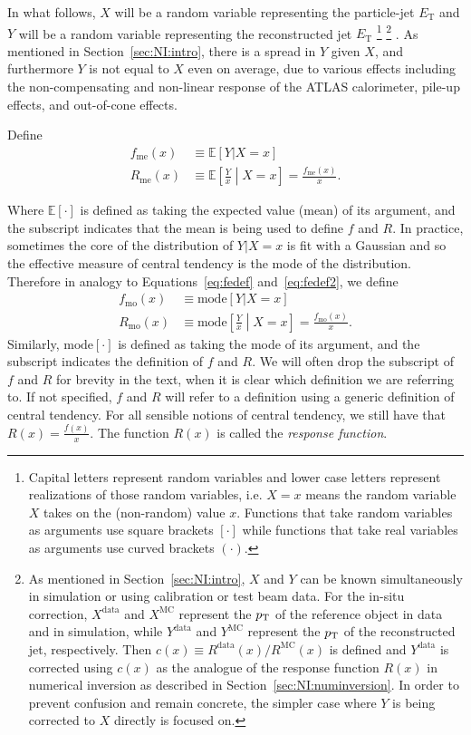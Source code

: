 In what follows, $X$ will be a random variable representing the particle-jet $E_\text{T}$ and $Y$ will be a random variable representing the reconstructed jet $E_\text{T}$
\footnote{Capital letters represent random variables and lower case letters represent realizations of those random variables, i.e. $X=x$ means the random variable $X$ takes on the (non-random) value $x$. Functions that take random variables as arguments use square brackets $[\cdot]$ while functions that take real variables as arguments use curved brackets $(\cdot)$.}
\footnote{As mentioned in Section~\ref{sec:NI:intro}, $X$ and $Y$ can be known simultaneously in simulation or using calibration or test beam data. For the in-situ correction, $X^\text{data}$ and $X^\text{MC}$ represent the $p_{\text{T}}$ of the reference object in data and in simulation, while $Y^\text{data}$ and $Y^\text{MC}$ represent the $p_{\text{T}}$ of the reconstructed jet, respectively. Then $c(x)\equiv R^\text{data}(x)/R^\text{MC}(x)$ is defined and $Y^\text{data}$ is corrected using $c(x)$ as the analogue of the response function $R(x)$ in numerical inversion as described in Section~\ref{sec:NI:numinversion}. In order to prevent confusion and remain concrete, the simpler case where $Y$ is being corrected to $X$ directly is focused on.}
.
As mentioned in Section~\ref{sec:NI:intro}, there is a spread in $Y$ given $X$, and furthermore $Y$ is not equal to $X$ even on average, due to various effects including the non-compensating and non-linear response of the ATLAS calorimeter, pile-up effects, and out-of-cone effects.

Define
\begin{align}
\label{eq:fedef}
f_\text{me}(x)&\equiv\mathbb{E}[Y|X=x]\\\label{eq:fedef2}
R_\text{me}(x) &\equiv \mathbb{E}\left[\frac{Y}{x}\middle| X=x\right] = \frac{f_\text{me}(x)}{x}. 
\end{align}

Where $\mathbb{E}[\cdot]$ is defined as taking the expected value (mean) of its argument, and the subscript indicates that the mean is being used to define $f$ and $R$.
In practice, sometimes the core of the distribution of $Y|X=x$ is fit with a Gaussian and so the effective measure of central tendency is the mode of the distribution.
Therefore in analogy to Equations~\ref{eq:fedef} and~\ref{eq:fedef2}, we define
\begin{align}
f_\text{mo}(x)&\equiv\text{mode}[Y|X=x]\\
R_\text{mo}(x) &\equiv \text{mode}\left[\frac{Y}{x}\middle| X=x\right] = \frac{f_\text{mo}(x)}{x}. 
\end{align}
Similarly, $\text{mode}[\cdot]$ is defined as taking the mode of its argument, and the subscript indicates the definition of $f$ and $R$.
We will often drop the subscript of $f$ and $R$ for brevity in the text, when it is clear which definition we are referring to.
If not specified, $f$ and $R$ will refer to a definition using a generic definition of central tendency.
For all sensible notions of central tendency, we still have that $R(x) = \frac{f(x)}{x}$.
The function $R(x)$ is called the {\it response function}.

